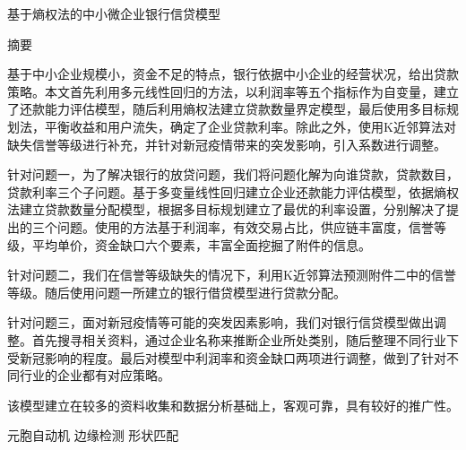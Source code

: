 \documentclass{my_paper}
\newcommand{\lunwenbiaoti}{\fontsize{15.75pt}{0}\heiti 基于熵权法的中小微企业银行信贷模型}
\newcommand{\zhaiyao}{\fontsize{14pt}{0}\heiti 摘要}
\begin{document}
\newpage
\begin{center}
\lunwenbiaoti

\vspace{2ex}
\zhaiyao
\end{center}

基于中小企业规模小，资金不足的特点，银行依据中小企业的经营状况，给出贷款策略。本文首先利用多元线性回归的方法，以利润率等五个指标作为自变量，建立了还款能力评估模型，随后利用熵权法建立贷款数量界定模型，最后使用多目标规划法，平衡收益和用户流失，确定了企业贷款利率。除此之外，使用K近邻算法对缺失信誉等级进行补充，并针对新冠疫情带来的突发影响，引入系数进行调整。

针对问题一，为了解决银行的放贷问题，我们将问题化解为向谁贷款，贷款数目，贷款利率三个子问题。基于多变量线性回归建立企业还款能力评估模型，依据熵权法建立贷款数量分配模型，根据多目标规划建立了最优的利率设置，分别解决了提出的三个问题。使用的方法基于利润率，有效交易占比，供应链丰富度，信誉等级，平均单价，资金缺口六个要素，丰富全面挖掘了附件的信息。

针对问题二，我们在信誉等级缺失的情况下，利用K近邻算法预测附件二中的信誉等级。随后使用问题一所建立的银行借贷模型进行贷款分配。

针对问题三，面对新冠疫情等可能的突发因素影响，我们对银行信贷模型做出调整。首先搜寻相关资料，通过企业名称来推断企业所处类别，随后整理不同行业下受新冠影响的程度。最后对模型中利润率和资金缺口两项进行调整，做到了针对不同行业的企业都有对应策略。

该模型建立在较多的资料收集和数据分析基础上，客观可靠，具有较好的推广性。

\begin{guanjianci}
 元胞自动机 \quad 边缘检测 \quad 形状匹配
\end{guanjianci}
\end{document}

